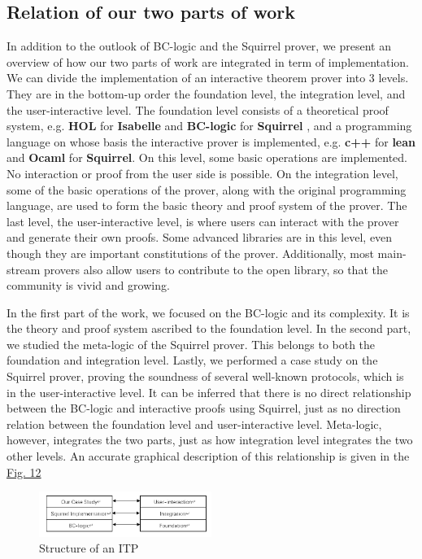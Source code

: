 \documentclass[conference]{IEEEtran}
\begin{document}
\subsection{Relation of our two parts of work}
In addition to the outlook of BC-logic and the Squirrel prover, we present an overview of how our two parts of work are integrated in term of implementation. We can divide the implementation of an interactive theorem prover into 3 levels. They are in the bottom-up order the foundation level, the integration level, and the user-interactive level. The foundation level consists of a theoretical proof system, e.g. \textbf{HOL} for \textbf{Isabelle} and \textbf{BC-logic} for \textbf{Squirrel} , and a programming language on whose basis the interactive prover is implemented, e.g. \textbf{c++} for \textbf{lean} and \textbf{Ocaml} for \textbf{Squirrel}. On this level, some basic operations are implemented. No interaction or proof from the user side is possible. On the integration level, some of the basic operations of the prover, along with the original programming language, are used to form the basic theory and proof system of the prover. The last level, the user-interactive level, is where users can interact with the prover and generate their own proofs. Some advanced libraries are in this level, even though they are important constitutions of the prover. Additionally, most main-stream provers also allow users to contribute to the open library, so that the community is vivid and growing.\cite{AFP}\cite{CoqComm}\cite{LeanContri}

In the first part of the work, we focused on the BC-logic and its complexity. It is the theory and proof system ascribed to the foundation level. In the second part, we studied the meta-logic of the Squirrel prover. This belongs to both the foundation and integration level. Lastly, we performed a case study on the Squirrel prover, proving the soundness of several well-known protocols, which is in the user-interactive level. It can be inferred that there is no direct relationship between the BC-logic and interactive proofs using Squirrel, just as no direction relation between the foundation level and user-interactive level. Meta-logic, however, integrates the two parts, just as how integration level integrates the two other levels. An accurate graphical description of this relationship is given in the \hyperref[figure:12]{Fig. 12}
\begin{figure}
\centering
   \includegraphics[width=0.5\textwidth]{ITP.png}
\caption{Structure of an ITP}
\label{figure:12}
\end{figure}
\end{document}
